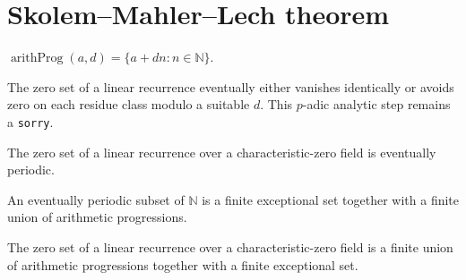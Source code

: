 \section{Skolem--Mahler--Lech theorem}

\begin{definition}
\label{def:sml-ap}
\leanok
$\operatorname{arithProg}(a,d)=\{a+dn:n\in\mathbb N\}$.
\end{definition}

\begin{lemma}
\label{lem:sml-padic}
\notready
The zero set of a linear recurrence eventually either vanishes identically or avoids zero on each residue class modulo a suitable $d$. This $p$-adic analytic step remains a \texttt{sorry}.
\end{lemma}

\begin{theorem}
\label{thm:sml-periodic}
\notready
{}
The zero set of a linear recurrence over a characteristic-zero field is eventually periodic.
\end{theorem}

\begin{theorem}
\label{thm:sml-decomp}
\leanok
{}
An eventually periodic subset of $\mathbb N$ is a finite exceptional set together with a finite union of arithmetic progressions.
\end{theorem}

\begin{theorem}
\label{thm:skolem-mahler-lech}
\notready
{}
The zero set of a linear recurrence over a characteristic-zero field is a finite union of arithmetic progressions together with a finite exceptional set.
\end{theorem}
